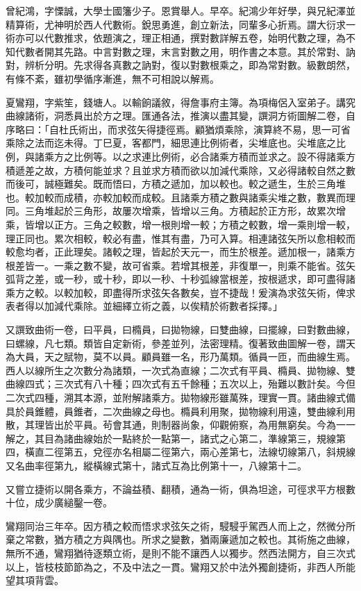 \begin{pinyinscope}
曾紀鴻，字慄誠，大學士國籓少子。恩賞舉人。早卒。紀鴻少年好學，與兄紀澤並精算術，尤神明於西人代數術。銳思勇進，創立新法，同輩多心折焉。謂大衍求一術亦可以代數推求，依題演之，理正相通，撰對數詳解五卷，始明代數之理，為不知代數者開其先路。中言對數之理，末言對數之用，明作書之本意。其於常對、訥對，辨析分明。先求得各真數之訥對，復以對數根乘之，即為常對數。級數朗然，有條不紊，雖初學循序漸進，無不可相說以解焉。

夏鸞翔，字紫笙，錢塘人。以輸餉議敘，得詹事府主簿。為項梅侶入室弟子。講究曲線諸術，洞悉員出於方之理。匯通各法，推演以盡其變，譔洞方術圖解二卷，自序略曰：「自杜氏術出，而求弦矢得捷徑焉。顧猶煩乘除，演算終不易，思一可省乘除之法而迄未得。丁巳夏，客都門，細思連比例術者，尖堆底也。尖堆底之比例，與諸乘方之比例等。以之求連比例術，必合諸乘方積而並求之。設不得諸乘方積遞差之故，方積何能並求？且並求方積而欲以加減代乘除，又必得諸較自然之數而後可，誠極難矣。既而悟曰，方積之遞加，加以較也。較之遞生，生於三角堆也。較加較而成積，亦較加較而成較。且諸乘方積之數與諸乘尖堆之數，數異而理同。三角堆起於三角形，故屢次增乘，皆增以三角。方積起於正方形，故累次增乘，皆增以正方。三角之較數，增一根則增一較；方積之較數，增一乘則增一較，理正同也。累次相較，較必有盡，惟其有盡，乃可入算。相連諸弦矢所以愈相較而較愈均者，正此理矣。諸較之理，皆起於天元一，而生於根差。遞加根一，諸乘方根差皆一。一乘之數不變，故可省乘。若增其根差，非復單一，則乘不能省。弦矢弧背之差，或一秒，或十秒，即以一秒、十秒弧線當根差，按根遞求，即可盡得諸乘方之較。以較加較，即盡得所求弦矢各數矣，豈不捷哉！爰演為求弦矢術，俾求表者得以加減代乘除。並細繹立術之義，以俟精於術數者採擇。」

又譔致曲術一卷，曰平員，曰橢員，曰拋物線，曰雙曲線，曰擺線，曰對數曲線，曰螺線，凡七類。類皆自定新術，參差並列，法密理精。復著致曲圖解一卷，謂天為大員，天之賦物，莫不以員。顧員雖一名，形乃萬類。循員一匝，而曲線生焉。西人以線所生之次數分為諸類，一次式為直線；二次式有平員、橢員、拋物線、雙曲線四式；三次式有八十種；四次式有五千餘種；五次以上，殆難以數計矣。今但二次式四種，溯其本源，並附解諸乘方。拋物線形雖萬殊，理實一貫。諸曲線式備具於員錐體，員錐者，二次曲線之母也。橢員利用聚，拋物線利用遠，雙曲線利用散，其理皆出於平員。茍會其通，則制器尚象，仰觀俯察，為用無窮矣。今為一一解之，其目為諸曲線始於一點終於一點第一，諸式之心第二，準線第三，規線第四，橫直二徑第五，兌徑亦名相屬二徑第六，兩心差第七，法線切線第八，斜規線又名曲率徑第九，縱橫線式第十，諸式互為比例第十一，八線第十二。

又嘗立捷術以開各乘方，不論益積、翻積，通為一術，俱為坦途，可徑求平方根數十位，成少廣縋鑿一卷。

鸞翔同治三年卒。因方積之較而悟求求弦矢之術，駸駸乎駕西人而上之，然微分所棄之常數，猶方積之方與隅也。所求之變數，猶兩廉遞加之較也。其術施之曲線，無所不通，鸞翔猶待逐類立術，是則不能不讓西人以獨步。然西法開方，自三次式以上，皆枝枝節節為之，不及中法之一貫。鸞翔又於中法外獨創捷術，非西人所能望其項背雲。


\end{pinyinscope}
